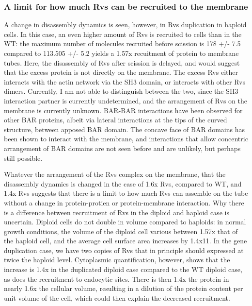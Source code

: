 \subsubsection{A limit for how much Rvs can be recruited to the membrane}
A change in disassembly dynamics is seen, however, in Rvs duplication in haploid cells. In this case, an even higher amount of Rvs is recruited to cells than in the WT: the maximum number of molecules recruited before scission is 178 +/- 7.5 compared to 113.505 +/- 5.2 yields a 1.57x recuitment of protein to membrane tubes. Here, the disassembly of Rvs after scission is delayed, and would suggest that the excess protein is not directly on the membrane. The excess Rvs either interacts with the actin network via the SH3 domain, or interacts with other Rvs dimers. Currently, I am not able to distinguish between the two, since the SH3 interaction partner is currently undetermined, and the arrangement of Rvs on the membrane is currently unknown. BAR-BAR interactions have been observed for other BAR proteins, albeit via lateral interactions at the tips of the curved structure, between apposed BAR domain. The concave face of BAR domains has been shown to interact with the membrane, and interactions that allow concentric arrangement of BAR domains are not seen before and are unlikely, but perhaps still possible.

	\vspace{5mm}
Whatever the arrangement of the Rvs complex on the membrane, that the disassembly dynamics is changed in the case of 1.6x Rvs, compared to WT, and 1.4x Rvs suggests that there is a limit to how much Rvs can assemble on the tube without a change in protein-protien or protein-membrane interaction. Why there is a difference between recruitment of Rvs in the diploid and haploid case is uncertain. Diploid cells do not double in volume compared to haploids: in normal growth conditions, the volume of the diploid cell various between 1.57x that of the haploid cell, and the average cell surface area increases by 1.4x11. In the gene duplication case, we have two copies of Rvs that in principle should expressed at twice the haploid level. Cytoplasmic quantification, however, shows that the increase is 1.4x in the duplicated diploid case compared to the WT diploid case, as does the recruitment to endocytic sites. There is then 1.4x the protein in nearly 1.6x the cellular volume, resulting in a dilution of the protein content per unit volume of the cell, which could then explain the decreased recruitment. 

